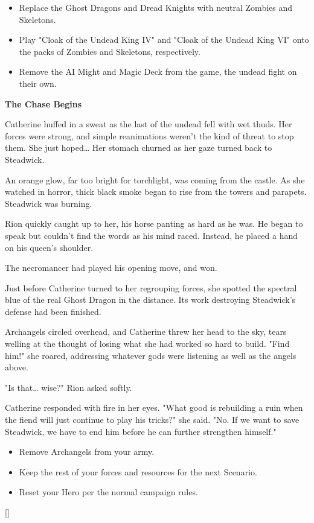 \begin{multicols*}{2}
\begin{itemize}
  \item \textcolor{darkcandyapplered}{Replace the Ghost Dragons and Dread Knights with  neutral Zombies and Skeletons.}
  \item \textcolor{darkcandyapplered}{Play "Cloak of the Undead King IV" and "Cloak of the Undead King VI" onto the packs of Zombies and Skeletons, respectively.}
  \item \textcolor{darkcandyapplered}{Remove the AI Might and Magic Deck from the game, the undead fight on their own.}
\end{itemize}


\textbf{The Chase Begins}

Catherine huffed in a sweat as the last of the undead fell with wet thuds. Her forces were strong, and simple reanimations weren't the kind of threat to stop them. She just hoped… Her stomach churned as her gaze turned back to Steadwick.

An orange glow, far too bright for torchlight, was coming from the castle. As she watched in horror, thick black smoke began to rise from the towers and parapets. Steadwick was burning.

Rion quickly caught up to her, his horse panting as hard as he was. He began to speak but couldn't find the words as his mind raced. Instead, he placed a hand on his queen's shoulder. 

The necromancer had played his opening move, and won.

Just before Catherine turned to her regrouping forces, she spotted the spectral blue of the real Ghost Dragon in the distance. Its work destroying Steadwick's defense had been finished.

Archangels circled overhead, and Catherine threw her head to the sky, tears welling at the thought of losing what she had worked so hard to build. "Find him!" she roared, addressing whatever gods were listening as well as the angels above.

"Is that… wise?" Rion asked softly.

Catherine responded with fire in her eyes. "What good is rebuilding a ruin when the fiend will just continue to play his tricks?" she said. "No. If we want to save Steadwick, we have to end him before he can further strengthen himself."

\begin{itemize}
  \item \textcolor{darkcandyapplered}{Remove Archangels from your army.}
  \item \textcolor{darkcandyapplered}{Keep the rest of your forces and resources for the next Scenario.}
  \item \textcolor{darkcandyapplered}{Reset your Hero per the normal campaign rules.}
\end{itemize}

\columnbreak

\begin{center}
\raisebox{0pt}[\dimexpr{}\baselineskip\relax]{}
\end{center}

\end{multicols*}






